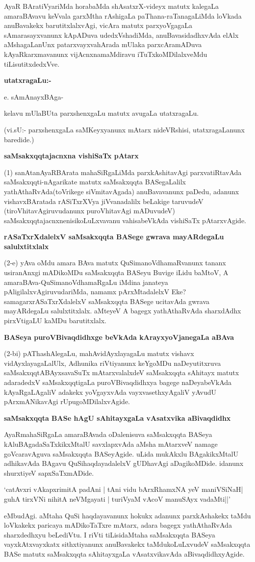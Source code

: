 AyaR BAratiVyariMda horabaMda shAsatxrX-videyx matutx kalegaLa amaraBAvavu keVvala garxMtha rAshigaLa paThana-raTanagaLiMda loVkada anuBavakekx barutitxlalxvAgi, vicAra matutx parxyoVgagaLa sAmarasayxvanunx kApADuva udedxVshadiMda, anuBavasidadhxvAda elAlx aMshagaLanUnx patarxvayxvahArada mUlaka parxcAramADuva kAyaRkarxmavanunx vijAcnxnamaMdiravu iTuTxkoMDilalxveMdu tiLisutitxdedxVve.

\textbf{utatxragaLu:-}

e. sAmAnayxBAga-

kelavu mUlaBUta parxshenxgaLu matutx avugaLa utatxragaLu.

(vi.sU:- parxshenxgaLa saMKeyxyanunx mAtarx nideVRshisi, utatxragaLanunx baredide.)

\textbf{saMsakxqqtajacnxna vishiSaTx pAtarx}

(1) sanAtanAyaRBArata mahaSiRgaLiMda parxkAshitavAgi parxvatiRtavAda saMsakxqqti-nAgarikate matutx saMsakxqqta BASegaLalilx yathAthaRvAda(toVrikege siVmitavAgada) anuBavavanunx paDedu, adanunx vishavxBAratada rASiTxrXVya jiVvanadalilx beLakige taruvudeV (tiroVhitavAgiruvudanunx puroVhitavAgi mADuvudeV) saMsakxqqtajacnxnenisikoLuLxvavanu vahisabeVkAda vishiSaTx pAtarxvAgide.

\textbf{rASaTxrXdalelxV saMsakxqqta BASege gwrava mayARdegaLu salulxtitxlalx}

(2-e) yAva oMdu amara BAva matutx QuSimanoVdhamaRvanunx tananx usiranAnxgi mADikoMDu saMsakxqqta BASeyu Buvige iLidu baMtoV, A amaraBAva-QuSimanoVdhamaRgaLu iMdina janateya pAligilalxvAgiruvudariMda, namamx pArxMtadalelxV Eke? samagarxrASaTxrXdalelxV saMsakxqqta BASege ucitavAda gwrava mayARdegaLu salulxtitxlalx. aMteyeV A bagegx yathAthaRvAda sharxdAdhx pirxVtigaLU kaMDu barutitxlalx.

\textbf{BASeya puroVBivaqdidhxge beVkAda kArayxyoVjanegaLa aBAva}

(2-bi) pAThashAlegaLu, mahAvidAyxlayagaLu matutx vishavx vidAyxlayagaLalUlx, Adhunika riVtiyanunx keYgoMDu naDeyutitxruva saMsakxqqtABAyxsavaSuTx mAtarxvalalxdeV saMsakxqqta sAhitayx matutx adaradedxV saMsakxqqtigaLa puroVBivaqdidhxya bagege naDeyabeVkAda kAyaRgaLAgaliV adakekx yoVgayxvAda vayxvasethxyAgaliV yAvudU pArxmANikavAgi rUpugoMDilalxvAgide.

\textbf{saMsakxqqta BASe hAgU sAhitayxgaLa vAsatxvika aBivaqdidhx}

AyaRmahaSiRgaLa amaraBAvada oDalenisuva saMsakxqqta BASeya kAluBAgadaSaTxkikxMtalU savxlapxvAda aMsha mAtarxveV namage goVcaravAguva saMsakxqqta BASeyAgide. uLida mukAkxlu BAgakikxMtalU adhikavAda BAgavu QuSihaqdayadalelxV gUDhavAgi aDagikoMDide. idanunx shurxtiyeV sapxSaTxmADide.
\begin{shloka}
`catAvxri vAkapxrimitA padAni | tAni vidu bArxRhamxNA yeV maniVSiNaH|\\
guhA tirxVNi nihitA neVMgayati | turiVyaM vAcoV manuSAyx vadaMti||'
\end{shloka}
eMbudAgi. aMtaha QuSi haqdayavanunx hokukx adanunx parxkAshakekx taMdu loVkakekx paricaya mADikoTaTxre mAtarx, adara bagegx yathAthaRvAda sharxdedhxyu beLediVtu. I riVti tiLisidaMtaha saMsakxqqta BASeya vayxkAtxvayxkatx sithxtiyanunx anuBavakekx taMdukoLuLxvudeV saMsakxqqta BASe matutx saMsakxqqta sAhitayxgaLa vAsatxvikavAda aBivaqdidhxyAgide.

